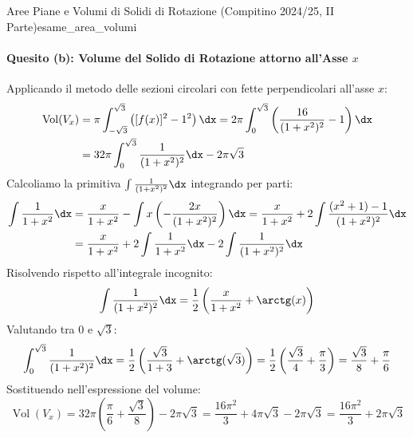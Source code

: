 \begin{esempio}{Aree Piane e Volumi di Solidi di Rotazione (Compitino 2024/25, II Parte)}{esame_area_volumi}
\paragraph{Quesito (b): Volume del Solido di Rotazione attorno all'Asse $x$}
Applicando il metodo delle sezioni circolari con fette perpendicolari all'asse $x$:
\begin{align*}
    \operatorname{Vol}(V_x) &= \pi \int_{-\sqrt{3}}^{\sqrt{3}} \left( [f(x)]^2 - 1^2 \right) \dx = 2\pi \int_0^{\sqrt{3}} \left( \frac{16}{(1 + x^2)^2} - 1 \right) \dx \\
    &= 32\pi \int_0^{\sqrt{3}} \frac{1}{(1 + x^2)^2} \dx - 2\pi\sqrt{3}
\end{align*}
Calcoliamo la primitiva $\int \frac{1}{(1 + x^2)^2}\dx$ integrando per parti:
\begin{align*}
    \int \frac{1}{1 + x^2}\dx &= \frac{x}{1 + x^2} - \int x \left(-\frac{2x}{(1 + x^2)^2}\right)\dx = \frac{x}{1 + x^2} + 2\int \frac{(x^2 + 1) - 1}{(1 + x^2)^2}\dx \\
    &= \frac{x}{1 + x^2} + 2\int \frac{1}{1 + x^2}\dx - 2\int \frac{1}{(1 + x^2)^2}\dx
\end{align*}
Risolvendo rispetto all'integrale incognito:
\[
    \int \frac{1}{(1 + x^2)^2}\dx = \frac{1}{2}\left( \frac{x}{1 + x^2} + \arctg(x) \right)
\]
Valutando tra $0$ e $\sqrt{3}$:
\[
    \int_0^{\sqrt{3}} \frac{1}{(1 + x^2)^2}\dx = \frac{1}{2}\left( \frac{\sqrt{3}}{1 + 3} + \arctg(\sqrt{3}) \right) = \frac{1}{2}\left( \frac{\sqrt{3}}{4} + \frac{\pi}{3} \right) = \frac{\sqrt{3}}{8} + \frac{\pi}{6}
\]
Sostituendo nell'espressione del volume:
\[
    \operatorname{Vol}(V_x) = 32\pi \left(\frac{\pi}{6} + \frac{\sqrt{3}}{8}\right) - 2\pi\sqrt{3} = \frac{16\pi^2}{3} + 4\pi\sqrt{3} - 2\pi\sqrt{3} = \frac{16\pi^2}{3} + 2\pi\sqrt{3}
\]


\end{esempio}
